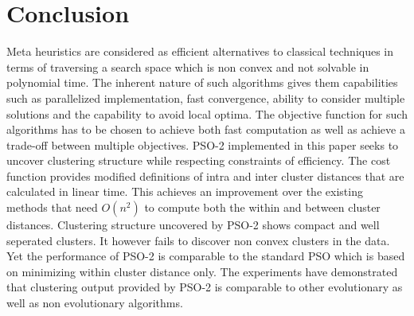\documentclass[conference]{IEEEtran}
\begin{document}
\section{Conclusion}
Meta heuristics are considered as efficient alternatives to classical techniques in terms of traversing a search space which is non convex and not solvable in polynomial time. The inherent nature of such algorithms gives them capabilities such as parallelized implementation, fast convergence, ability to consider multiple solutions and the capability to avoid local optima. The objective function for such algorithms has to be chosen to achieve both fast computation as well as achieve a trade-off between multiple objectives. PSO-2 implemented in this paper seeks to uncover clustering structure while respecting constraints of efficiency. The cost function provides modified definitions of intra and inter cluster distances that are calculated in linear time. This achieves an improvement over the existing methods that need $O(n^2)$ to compute both the within and between cluster distances. Clustering structure uncovered by PSO-2 shows compact and well seperated clusters. It however fails to discover non convex clusters in the data. Yet the performance of PSO-2 is comparable to the standard PSO which is based on minimizing within cluster distance only. The experiments have demonstrated that clustering output provided by PSO-2 is comparable to other evolutionary as well as non evolutionary algorithms. 











\end{document}
